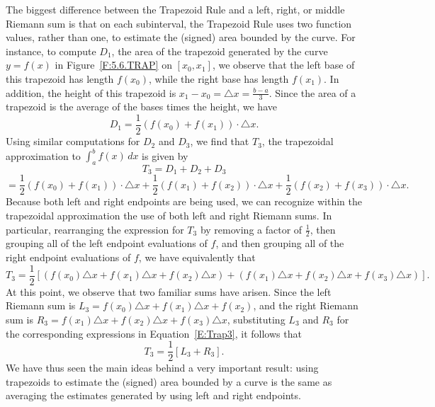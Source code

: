 The biggest difference between the Trapezoid Rule and a left, right, or middle Riemann sum is that on each subinterval, the Trapezoid Rule uses two function values, rather than one, to estimate the (signed) area bounded by the curve.  For instance, to compute $D_1$, the area of the trapezoid generated by the curve $y = f(x)$ in Figure~\ref{F:5.6.TRAP} on $[x_0, x_1]$, we observe that the left base of this trapezoid has length $f(x_0)$, while the right base has length $f(x_1)$.  In addition, the height of this trapezoid is $x_1 - x_0 = \triangle x = \frac{b-a}{3}$.  Since the area of a trapezoid is the average of the bases times the height, we have
$$D_1 = \frac{1}{2}(f(x_0) + f(x_1)) \cdot \triangle x.$$
Using similar computations for $D_2$ and $D_3$, we find that $T_3$, the trapezoidal approximation to $\int_a^b f(x) \, dx$ is given by \small
\[T_3  =  D_1 + D_2 + D_3 \]
\[=   \frac{1}{2}(f(x_0) + f(x_1)) \cdot \triangle x +  \frac{1}{2}(f(x_1) + f(x_2)) \cdot \triangle x  +  \frac{1}{2}(f(x_2) + f(x_3)) \cdot \triangle x.\] \normalsize
Because both left and right endpoints are being used, we can recognize within the trapezoidal approximation the use of both left and right Riemann sums.  In particular, rearranging the expression for $T_3$ by removing a factor of $\frac{1}{2}$, then grouping all of the left endpoint evaluations of $f$, and then grouping all of the right endpoint evaluations of $f$, we have equivalently that \small
\begin{equation} \label{E:Trap3}
T_3 =  \frac{1}{2} \left[ (f(x_0) \triangle x + f(x_1) \triangle x + f(x_2) \triangle x)  + (f(x_1) \triangle x + f(x_2) \triangle x + f(x_3) \triangle x) \right].
\end{equation}\normalsize
At this point, we observe that two familiar sums have arisen.  Since the left Riemann sum is $L_3 = f(x_0) \triangle x + f(x_1) \triangle x + f(x_2)$, and the right Riemann sum is $R_3 = f(x_1) \triangle x + f(x_2) \triangle x + f(x_3) \triangle x$, substituting $L_3$ and $R_3$ for the corresponding expressions in Equation~\ref{E:Trap3}, it follows that
$$T_3 = \frac{1}{2} \left[ L_3 + R_3 \right].$$
We have thus seen the main ideas behind a very important result:  using trapezoids to estimate the (signed) area bounded by a curve is the same as averaging the estimates generated by using left and right endpoints.


